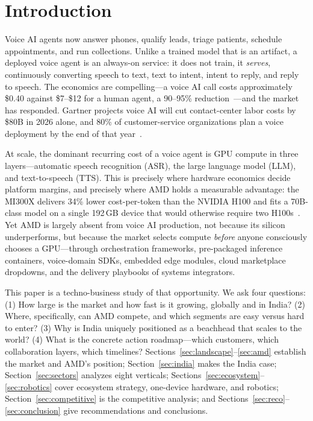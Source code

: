 \documentclass[blind]{gtac}
\begin{document}

\section{Introduction}
\label{sec:intro}

Voice AI agents now answer phones, qualify leads, triage patients, schedule appointments, and run collections. Unlike a trained model that is an artifact, a deployed voice agent is an always-on service: it does not train, it \emph{serves}, continuously converting speech to text, text to intent, intent to reply, and reply to speech. The economics are compelling---a voice AI call costs approximately \$0.40 against \$7--\$12 for a human agent, a 90--95\% reduction~\cite{assemblyai_2026,grandview}---and the market has responded. Gartner projects voice AI will cut contact-center labor costs by \$80B in 2026 alone, and 80\% of customer-service organizations plan a voice deployment by the end of that year~\cite{assemblyai_2026}.

At scale, the dominant recurring cost of a voice agent is GPU compute in three layers---automatic speech recognition (ASR), the large language model (LLM), and text-to-speech (TTS). This is precisely where hardware economics decide platform margins, and precisely where AMD holds a measurable advantage: the MI300X delivers 34\% lower cost-per-token than the NVIDIA H100 and fits a 70B-class model on a single 192\,GB device that would otherwise require two H100s~\cite{spheron_rocm,vllm_rocm}. Yet AMD is largely absent from voice AI production, not because its silicon underperforms, but because the market selects compute \emph{before} anyone consciously chooses a GPU---through orchestration frameworks, pre-packaged inference containers, voice-domain SDKs, embedded edge modules, cloud marketplace dropdowns, and the delivery playbooks of systems integrators.

This paper is a techno-business study of that opportunity. We ask four questions: (1) How large is the market and how fast is it growing, globally and in India? (2) Where, specifically, can AMD compete, and which segments are easy versus hard to enter? (3) Why is India uniquely positioned as a beachhead that scales to the world? (4) What is the concrete action roadmap---which customers, which collaboration layers, which timelines? Sections~\ref{sec:landscape}--\ref{sec:amd} establish the market and AMD's position; Section~\ref{sec:india} makes the India case; Section~\ref{sec:sectors} analyzes eight verticals; Sections~\ref{sec:ecosystem}--\ref{sec:robotics} cover ecosystem strategy, one-device hardware, and robotics; Section~\ref{sec:competitive} is the competitive analysis; and Sections~\ref{sec:reco}--\ref{sec:conclusion} give recommendations and conclusions.
\end{document}
